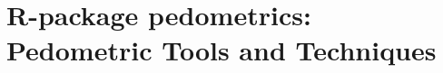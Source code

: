 \artigofalse
\chapter{R-package pedometrics: Pedometric Tools and Techniques}
\label{apen:pedometrics}


